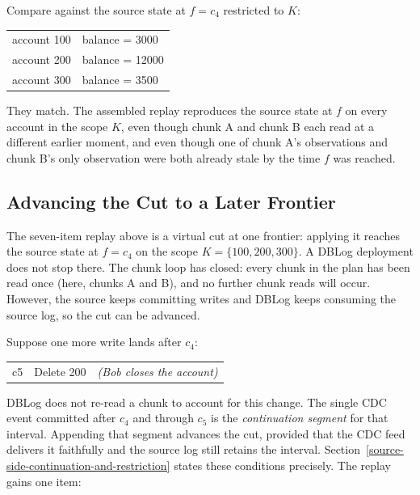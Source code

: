 \documentclass[letterpaper,10pt,twocolumn]{article}
\begin{document}
Compare against the source state at $f = c_4$ restricted to
$K$:

\begin{center}\ttfamily\footnotesize
\begin{tabular}{@{}l@{\hskip 1em}l@{}}
account 100 & balance = \phantom{0}3000\\
account 200 & balance = 12000\\
account 300 & balance = \phantom{0}3500\\
\end{tabular}
\end{center}

They match. The assembled replay reproduces the source state at $f$ on
every account in the scope $K$, even though chunk A and chunk B each read
at a different earlier moment, and even though one of chunk A's
observations and chunk B's only observation were both already stale by
the time $f$ was reached.

\subsection{Advancing the Cut to a Later
Frontier}\label{continuation-beat-advancing-the-cut}

The seven-item replay above is a virtual cut at one frontier: applying
it reaches the source state at $f = c_4$ on the scope
$K = \{100, 200, 300\}$. A DBLog deployment does not stop there. The
chunk loop has closed: every chunk in the plan has been read once
(here, chunks A and B), and no further chunk reads will occur.
However, the source keeps committing writes and DBLog keeps consuming
the source log, so the cut can be advanced.

Suppose one more write lands after $c_4$:

\begin{center}\footnotesize
\begin{tabular}{@{}l@{\hskip 1em}l@{\hskip 1em}l@{}}
\ttfamily c5 & \ttfamily Delete 200 & \itshape (Bob closes the account)\\
\end{tabular}
\end{center}

DBLog does not re-read a chunk to account for this change. The single
CDC event committed after $c_4$ and through $c_5$ is the
\emph{continuation segment} for that interval. Appending that segment
advances the cut, provided that the CDC feed delivers it faithfully and
the source log still retains the interval. Section~\ref{source-side-continuation-and-restriction}
states these conditions precisely.
The replay gains one item:
\end{document}
